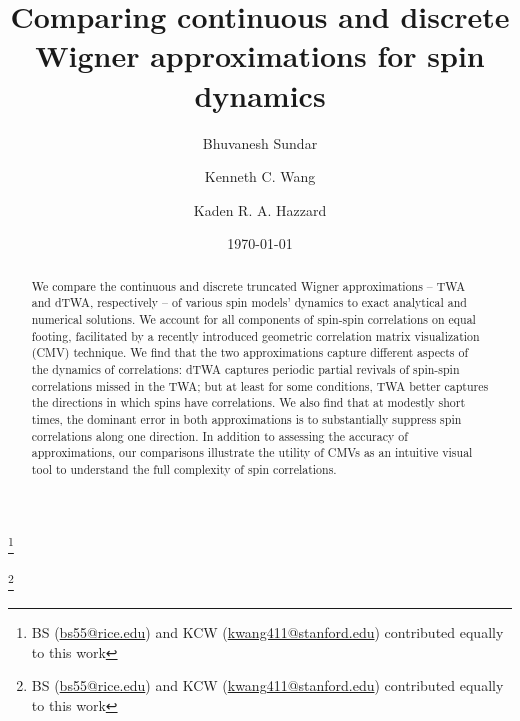 \documentclass[pra,reprint,superscriptaddress]{revtex4-1}
\begin{document}
\author{Bhuvanesh Sundar}
\thanks{BS (\href{mailto:bs55@rice.edu}{bs55@rice.edu}) and KCW (\href{mailto:kwang411@stanford.edu}{kwang411@stanford.edu}) contributed equally to this work}

\author{Kenneth C. Wang}
\thanks{BS (\href{mailto:bs55@rice.edu}{bs55@rice.edu}) and KCW (\href{mailto:kwang411@stanford.edu}{kwang411@stanford.edu}) contributed equally to this work}

\author{Kaden R. A. Hazzard}

\title{Comparing continuous and discrete Wigner approximations for spin dynamics}
\date{\today}

\begin{abstract}
We compare the continuous and discrete truncated Wigner approximations -- TWA and dTWA, respectively -- of various spin models' dynamics to exact analytical and numerical solutions. We account for all components of spin-spin correlations on equal footing, facilitated by a recently introduced geometric correlation matrix visualization (CMV) technique. We find that the two approximations capture different aspects of the dynamics of correlations: dTWA captures periodic partial revivals of spin-spin correlations missed in the TWA; but at least for some conditions, TWA better captures the directions in which spins have correlations. We also find that at modestly short times, the dominant error in both approximations is to substantially suppress spin correlations along one direction. In addition to assessing the accuracy of approximations, our comparisons illustrate the utility of CMVs as an intuitive visual tool to understand the full complexity of spin correlations.
\end{abstract}

\maketitle
\end{document}
